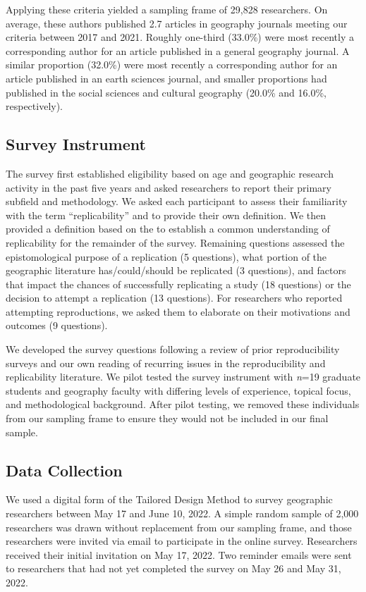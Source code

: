 \documentclass[]{interact}
\theoremstyle{plain}%
\theoremstyle{definition}
\theoremstyle{remark}
\begin{document}
Applying these criteria yielded a sampling frame of 29,828 researchers. 
On average, these authors published 2.7 articles in geography journals meeting our criteria between 2017 and 2021. 
Roughly one-third (33.0\%) were most recently a corresponding author for an article published in a general geography journal. 
A similar proportion (32.0\%) were most recently a corresponding author for an article published in an earth sciences journal, and smaller proportions had published in the social sciences and cultural geography (20.0\% and 16.0\%, respectively).

\subsection*{Survey Instrument}
The survey first established eligibility based on age and geographic research activity in the past five years and asked researchers to report their primary subfield and methodology.
We asked each participant to assess their familiarity with the term ``replicability'' and to provide their own definition. 
We then provided a definition based on the \citet{nosek2020replication}  to establish a common understanding of replicability for the remainder of the survey.
Remaining questions assessed the epistomological purpose of a replication (5 questions), what portion of the geographic literature has/could/should be replicated (3 questions), and factors that impact the chances of successfully replicating a study (18 questions) or the decision to attempt a replication (13 questions).
For researchers who reported attempting reproductions, we asked them to elaborate on their motivations and outcomes (9 questions).

We developed the survey questions following a review of prior reproducibility surveys \citep[e.g.,][]{fanelli2009many,baker20161, konkol2019} and our own reading of recurring issues in the reproducibility and replicability literature. 
We pilot tested the survey instrument with \textit{n}=19 graduate students and geography faculty with differing levels of experience, topical focus, and methodological background. 
After pilot testing, we removed these individuals from our sampling frame to ensure they would not be included in our final sample.

\subsection*{Data Collection}
We used a digital form of the Tailored Design Method \citep{dillman2014internet} to survey geographic researchers between May 17 and June 10, 2022.
A simple random sample of 2,000 researchers was drawn without replacement from our sampling frame, and those researchers were invited via email to participate in the online survey. 
Researchers received their initial invitation on May 17, 2022. 
Two reminder emails were sent to researchers that had not yet completed the survey on May 26 and May 31, 2022.
\end{document}
